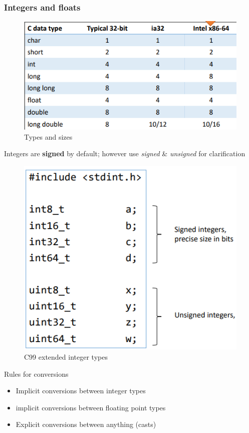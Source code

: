 \documentclass[a4paper,10pt]{article}
\begin{document}
\subsubsection{Integers and floats}
\begin{figure}[htp]
    \centering
    \includegraphics[width=1\linewidth]{e10.png}
    \caption{Types and sizes}
\end{figure}
\begin{tipbox}
    {}
    Integers are \textbf{signed} by default; however use \textit{signed} \& \textit{unsigned} for clarification
\end{tipbox}
\begin{figure}[h]
        \centering
        \includegraphics[width=0.7\linewidth]{e11.png}
        \caption{C99 extended integer types}
    \end{figure}
\pagebreak
\begin{tbox}
    {Rules for conversions}
    \begin{itemize}
        \item Implicit conversions between integer types
        \item implicit conversions between floating point types
        \item Explicit conversions between anything (casts)
    \end{itemize}
\end{tbox}
\end{document}
